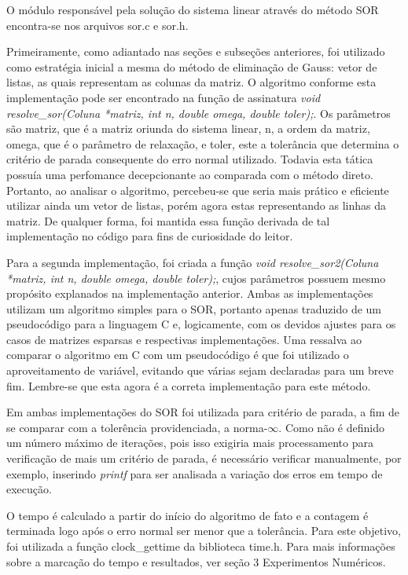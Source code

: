 \documentclass[
	article,			%
	11pt,				%
	oneside,			%
	a4paper,			%
	english,			%
	brazil,				%
	sumario=tradicional
	]{abntex2}
\begin{document}
O módulo responsável pela solução do sistema linear através do método SOR encontra-se nos arquivos sor.c e sor.h.

Primeiramente, como adiantado nas seções e subseções anteriores,  foi utilizado como estratégia inicial a mesma do método de eliminação de Gauss: vetor de listas, as quais representam as colunas da matriz. O algoritmo conforme esta implementação pode ser encontrado na função de assinatura \emph{void resolve\_sor(Coluna *matriz, int n, double omega, double toler);}. Os parâmetros são matriz, que é a matriz oriunda do sistema linear, n, a ordem da matriz, omega, que é o parâmetro de relaxação, e toler, este a tolerância que determina o critério de parada consequente do erro normal utilizado. Todavia esta tática possuía uma perfomance decepcionante ao comparada com o método direto. Portanto, ao analisar o algoritmo, percebeu-se que seria mais prático e eficiente utilizar ainda um vetor de listas, porém agora estas representando as linhas da matriz. De qualquer forma, foi mantida essa função derivada de tal implementação no código para fins de curiosidade do leitor. 

Para a segunda implementação, foi criada a função \emph{void resolve\_sor2(Coluna *matriz, int n, double omega, double toler);}, cujos parâmetros possuem mesmo propósito explanados na implementação anterior. Ambas as implementações utilizam um algoritmo simples para o SOR, portanto apenas traduzido de um pseudocódigo para a linguagem C e, logicamente, com os devidos ajustes para os casos de matrizes esparsas e respectivas implementações. Uma ressalva ao comparar o algoritmo em C com um pseudocódigo é que foi utilizado o aproveitamento de variável, evitando que várias sejam declaradas para um breve fim. Lembre-se que esta agora é a correta implementação para este método.

Em ambas implementações do SOR foi utilizada para critério de parada, a fim de se comparar com a tolerência providenciada, a norma-$\infty$. Como não é definido um número máximo de iterações, pois isso exigiria mais processamento para verificação de mais um critério de parada, é necessário verificar manualmente, por exemplo, inserindo \emph{printf} para ser analisada a variação dos erros em tempo de execução.

O tempo é calculado a partir do início do algoritmo de fato e a contagem é terminada logo após o erro normal ser menor que a tolerância. Para este objetivo, foi utilizada a função clock\_gettime da biblioteca time.h. Para mais informações sobre a marcação do tempo e resultados, ver seção 3 Experimentos Numéricos.
\end{document}
